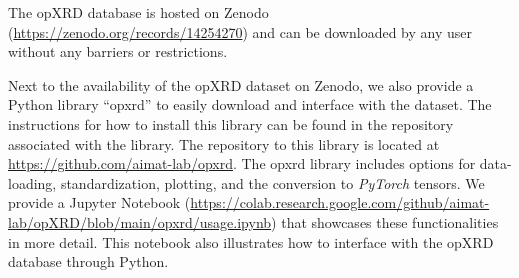 The opXRD database is hosted on Zenodo (\url{https://zenodo.org/records/14254270}) and can be downloaded by any user without any barriers or restrictions.

Next to the availability of the opXRD dataset on Zenodo, we also provide a Python library ``opxrd'' to easily download and interface with the dataset. The instructions for how to install this library can be found in the repository associated with the library. The repository to this library is located at \url{https://github.com/aimat-lab/opxrd}. The opxrd library includes options for data-loading, standardization, plotting, and the conversion to \emph{PyTorch} tensors. We provide a Jupyter Notebook (\url{https://colab.research.google.com/github/aimat-lab/opXRD/blob/main/opxrd/usage.ipynb})
that showcases these functionalities in more detail. This notebook also illustrates how to interface with the opXRD database through Python. 